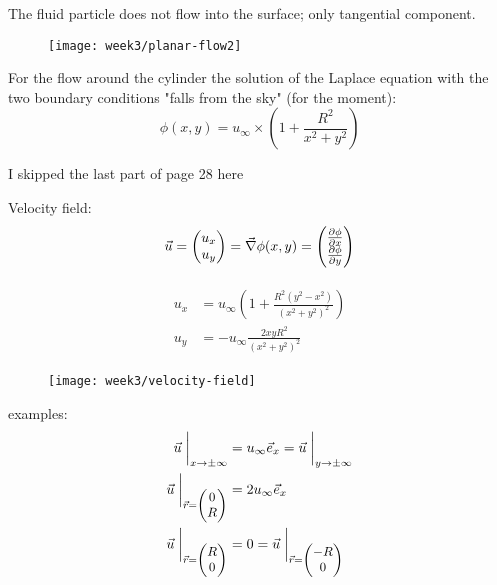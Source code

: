 The fluid particle does not flow into the surface; only tangential component.

\begin{figure}[!h]
    \centering
    \texttt{[image: week3/planar-flow2]}
    \caption{}
    \label{fig:planar-flow2}
\end{figure}

For the flow around the cylinder the solution of the Laplace equation with the two boundary conditions "falls from the sky" (for the moment):
\begin{equation}
\phi(x,y)=u_\infty\times\left(1+\frac{R^2}{x^2+y^2}\right)
\end{equation}

\begin{shaded}
I skipped the last part of page 28 here
\end{shaded}

Velocity field:
\begin{equation}
\vec{u} = \begin{pmatrix}
u_x\\u_y
\end{pmatrix}  = 
\vec{\nabla}\phi(x,y) = \begin{pmatrix}
\frac{\partial \phi}{\partial x} \\
\frac{\partial \phi}{\partial y}
\end{pmatrix}
\end{equation}

\begin{align}
\begin{split}\label{eq:uxuy1}
u_x &= u_\infty\left(1+\frac{R^2(y^2-x^2)}{(x^2+y^2)^2}\right)\\
u_y &= -u_\infty \frac{2xyR^2}{(x^2+y^2)^2}
\end{split}
\end{align}

\begin{figure}[!h]
    \centering
    \texttt{[image: week3/velocity-field]}
    \caption{}
    \label{fig:velocity-field}
\end{figure}

examples:
\begin{align}
\vec{u}\biggm\vert_{x\rightarrow\pm\infty} &= u_\infty\vec{e}_x = \vec{u}\biggm\vert_{y\rightarrow\pm\infty}\\
\vec{u}\biggm\vert_{\small\vec{r}=\begin{pmatrix} 0 \\ R
\end{pmatrix}} &= 2u_\infty\vec{e}_x \\
\vec{u}\biggm\vert_{\small\vec{r}=\begin{pmatrix} R \\ 0
\end{pmatrix}} &= 0 = \vec{u}\biggm\vert_{\small\vec{r}=\begin{pmatrix} -R \\ 0
\end{pmatrix}}
\end{align}



